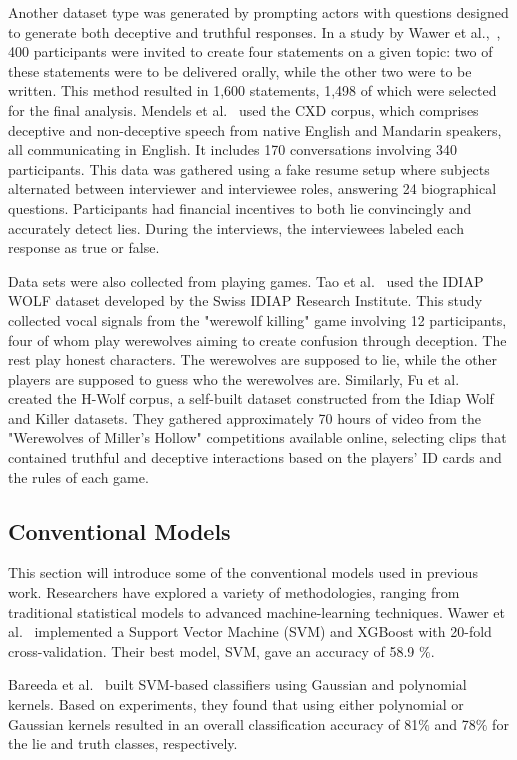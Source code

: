 \documentclass[12pt]{article}
\begin{document}
Another dataset type was generated by prompting actors with questions designed to generate both deceptive and truthful responses. In a study by Wawer et al.,~\cite{sarzynska2023truth}, 400 participants were invited to create four statements on a given topic: two of these statements were to be delivered orally, while the other two were to be written. This method resulted in 1,600 statements, 1,498 of which were selected for the final analysis. Mendels et al.~\cite{mendels2017hybrid} used the CXD corpus, which comprises deceptive and non-deceptive speech from native English and Mandarin speakers, all communicating in English. It includes 170 conversations involving 340 participants. This data was gathered using a fake resume setup where subjects alternated between interviewer and interviewee roles, answering 24 biographical questions. Participants had financial incentives to both lie convincingly and accurately detect lies. During the interviews, the interviewees labeled each response as true or false. 
  

Data sets were also collected from playing games. Tao et al.~\cite{tao2019speech} used the IDIAP WOLF dataset developed by the Swiss IDIAP Research Institute. This study collected vocal signals from the "werewolf killing" game involving 12 participants, four of whom play werewolves aiming to create confusion through deception. The rest play honest characters. The werewolves are supposed to lie, while the other players are supposed to guess who the werewolves are. Similarly, Fu et al.~\cite{fu2023semi} created the H-Wolf corpus, a self-built dataset constructed from the Idiap Wolf and Killer datasets. They gathered approximately 70 hours of video from the "Werewolves of Miller’s Hollow" competitions available online, selecting clips that contained truthful and deceptive interactions based on the players' ID cards and the rules of each game.

\subsection{Conventional Models}
This section will introduce some of the conventional models used in previous work. Researchers have explored a variety of methodologies, ranging from traditional statistical models to advanced machine-learning techniques. Wawer et al.~\cite{sarzynska2023truth} implemented a Support Vector Machine (SVM) and XGBoost with 20-fold cross-validation. Their best model, SVM, gave an accuracy of 58.9 $\%$. 
  
Bareeda et al.~\cite{bareeda2021lie} built SVM-based classifiers using Gaussian and polynomial kernels. Based on experiments, they found that using either polynomial or Gaussian kernels resulted in an overall classification accuracy of 81$\%$ and 78$\%$ for the lie and truth classes, respectively. 
  
\end{document}

